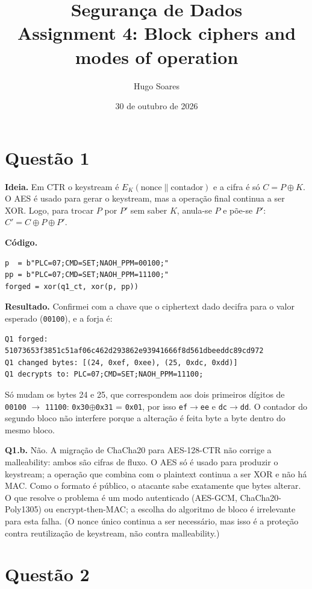 \documentclass[11pt,a4paper]{article}
\title{Segurança de Dados\\\large Assignment 4: Block ciphers and modes of operation}
\author{Hugo Soares}
\date{30 de outubro de 2026}
\begin{document}
\maketitle

\section*{Questão 1}

\textbf{Ideia.} Em CTR o keystream é $E_K(\text{nonce} \| \text{contador})$ e a
cifra é só $C = P \oplus K$. O AES é usado para gerar o keystream, mas a
operação final continua a ser XOR. Logo, para trocar $P$ por $P'$ sem saber
$K$, anula-se $P$ e põe-se $P'$:
$C' = C \oplus P \oplus P'$.

\textbf{Código.}

\begin{verbatim}
p  = b"PLC=07;CMD=SET;NAOH_PPM=00100;"
pp = b"PLC=07;CMD=SET;NAOH_PPM=11100;"
forged = xor(q1_ct, xor(p, pp))
\end{verbatim}

\textbf{Resultado.} Confirmei com a chave que o ciphertext dado decifra para o
valor esperado (\texttt{00100}), e a forja é:

\begin{verbatim}
Q1 forged: 51073653f3851c51af06c462d293862e93941666f8d561dbeeddc89cd972
Q1 changed bytes: [(24, 0xef, 0xee), (25, 0xdc, 0xdd)]
Q1 decrypts to: PLC=07;CMD=SET;NAOH_PPM=11100;
\end{verbatim}

Só mudam os bytes 24 e 25, que correspondem aos dois primeiros dígitos de
\texttt{00100} $\to$ \texttt{11100}: \texttt{0x30}$\oplus$\texttt{0x31} =
\texttt{0x01}, por isso \texttt{ef}$\to$\texttt{ee} e \texttt{dc}$\to$\texttt{dd}.
O contador do segundo bloco não interfere porque a alteração é feita byte a
byte dentro do mesmo bloco.

\textbf{Q1.b.} Não. A migração de ChaCha20 para AES-128-CTR não corrige a
malleability: ambos são cifras de fluxo. O AES só é usado para produzir o
keystream; a operação que combina com o plaintext continua a ser XOR e não há
MAC. Como o formato é público, o atacante sabe exatamente que bytes alterar.
O que resolve o problema é um modo autenticado (AES-GCM, ChaCha20-Poly1305) ou
encrypt-then-MAC; a escolha do algoritmo de bloco é irrelevante para esta
falha. (O nonce único continua a ser necessário, mas isso é a proteção contra
reutilização de keystream, não contra malleability.)

\section*{Questão 2}
\end{document}
